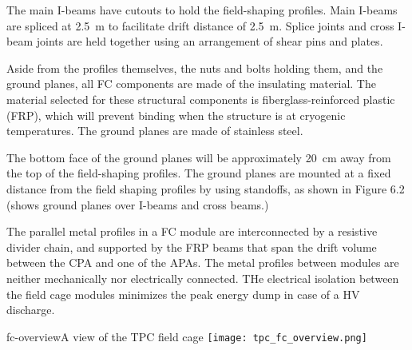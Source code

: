 The main I-beams have cutouts to hold the field-shaping profiles. Main I-beams are spliced at 2.5~m to facilitate drift distance %
of 2.5~m. Splice joints and cross I-beam joints are held together using an arrangement of shear pins and plates. 

Aside from the profiles themselves, the nuts and bolts holding them, and the ground planes, all FC components are made of the insulating material. The material selected for these structural components is fiberglass-reinforced plastic (FRP), which will prevent binding when the structure is at cryogenic temperatures. The ground planes are made of stainless steel. 


The bottom face of the ground planes will be approximately 20~cm away from the top of the field-shaping profiles. The ground planes are mounted at a fixed distance from the field shaping profiles by using standoffs, as shown in Figure 6.2 (shows ground planes over I-beams and cross beams.)

The parallel metal profiles in a FC module 
 are interconnected by a resistive divider chain, and supported by the FRP beams that span the drift volume between the CPA and one of the APAs. 
The metal profiles between modules are neither mechanically nor electrically connected. THe electrical isolation between the field cage modules minimizes the peak energy dump in case of a HV discharge.


\begin{cdrfigure}{fc-overview}{A view of the TPC field cage}
\texttt{[image: tpc\_fc\_overview.png]}
\end{cdrfigure}

